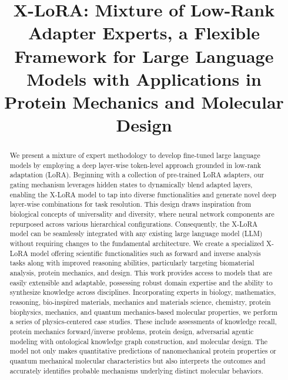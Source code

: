 \title{X-LoRA: Mixture of Low-Rank Adapter Experts, a Flexible Framework for Large Language Models with Applications in Protein Mechanics and Molecular Design}

\begin{abstract}
We present a mixture of expert methodology to develop fine-tuned large language models by employing a deep layer-wise token-level approach grounded in low-rank adaptation (LoRA). Beginning with a collection of pre-trained LoRA adapters, our gating mechanism leverages hidden states to dynamically blend adapted layers, enabling the X-LoRA model to tap into diverse functionalities and generate novel deep layer-wise combinations for task resolution. This design draws inspiration from biological concepts of universality and diversity, where neural network components are repurposed across various hierarchical configurations. Consequently, the X-LoRA model can be seamlessly integrated with any existing large language model (LLM) without requiring changes to the fundamental architecture. We create a specialized X-LoRA model offering scientific functionalities such as forward and inverse analysis tasks along with improved reasoning abilities, particularly targeting biomaterial analysis, protein mechanics, and design. This work provides access to models that are easily extensible and adaptable, possessing robust domain expertise and the ability to synthesize knowledge across disciplines. Incorporating experts in biology, mathematics, reasoning, bio-inspired materials, mechanics and materials science, chemistry, protein biophysics, mechanics, and quantum mechanics-based molecular properties, we perform a series of physics-centered case studies. These include assessments of knowledge recall, protein mechanics forward/inverse problems, protein design, adversarial agentic modeling with ontological knowledge graph construction, and molecular design. The model not only makes quantitative predictions of nanomechanical protein properties or quantum mechanical molecular characteristics but also interprets the outcomes and accurately identifies probable mechanisms underlying distinct molecular behaviors.
\end{abstract}

